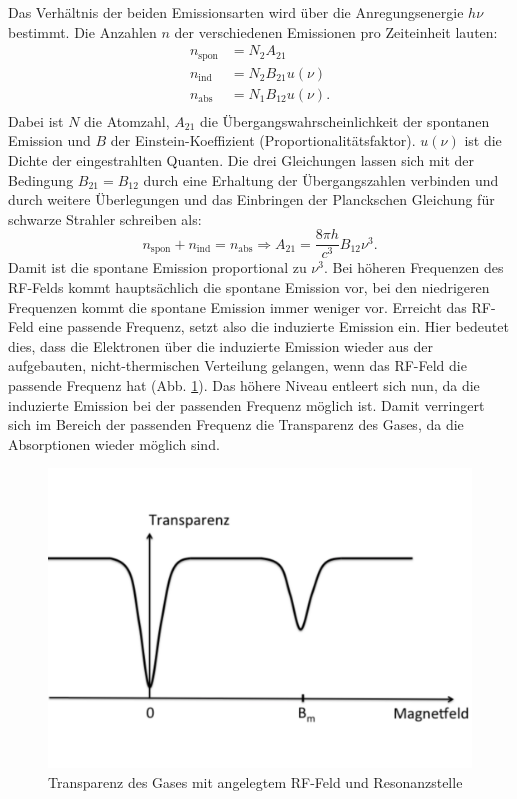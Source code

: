 Das Verhältnis der beiden Emissionsarten wird über die Anregungsenergie $h \nu$ bestimmt.
Die Anzahlen $n$ der verschiedenen Emissionen pro Zeiteinheit lauten:
\begin{align*}
n_{\text{spon}} &= N_{2} A_{21}        \\
n_{\text{ind}}  &= N_{2} B_{21} u(\nu) \\
n_{\text{abs}}  &= N_{1} B_{12} u(\nu).\\
\end{align*}
Dabei ist $N$ die Atomzahl, $A_{21}$ die Übergangswahrscheinlichkeit der spontanen Emission und $B$ der Einstein-Koeffizient (Proportionalitätsfaktor).
$u(\nu)$ ist die Dichte der eingestrahlten Quanten.
Die drei Gleichungen lassen sich mit der Bedingung $B_{21}=B_{12}$ durch eine Erhaltung der Übergangszahlen verbinden und durch weitere Überlegungen und das Einbringen der Planckschen Gleichung für schwarze Strahler schreiben als:
\begin{equation*}
  n_{\text{spon}} + n_{\text{ind}} = n_{\text{abs}} \Rightarrow A_{21}= \frac{8 \pi h}{c^{3}}B_{12} \nu^{3}.
\end{equation*}
Damit ist die spontane Emission proportional zu $\nu^3$.
Bei höheren Frequenzen des RF-Felds kommt hauptsächlich die spontane Emission vor, bei den niedrigeren Frequenzen kommt die spontane Emission immer weniger vor.
Erreicht das RF-Feld eine passende Frequenz, setzt also die induzierte Emission ein.
Hier bedeutet dies, dass die Elektronen über die induzierte Emission wieder aus der aufgebauten, nicht-thermischen Verteilung gelangen, wenn das RF-Feld die passende Frequenz hat (Abb. \ref{fig:transparenz}).
Das höhere Niveau entleert sich nun, da die induzierte Emission bei der passenden Frequenz möglich ist.
Damit verringert sich im Bereich der passenden Frequenz die Transparenz des Gases, da die Absorptionen wieder möglich sind.
\begin{figure}[h!]
  \centering
  \includegraphics[width=\textwidth]{transparenz.pdf}
  \caption{Transparenz des Gases mit angelegtem RF-Feld und Resonanzstelle \cite{1}}
  \label{fig:transparenz}
\end{figure}
